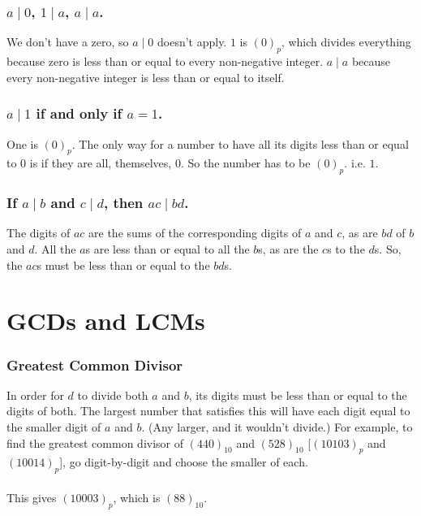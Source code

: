 \documentclass[12pt]{article}
\newcommand{\ppn}[1]{(#1)_p}
\begin{document}
\subsubsection*{$a \mid 0$, $1 \mid a$, $a \mid a$.}
We don't have a zero, so $a \mid 0$ doesn't apply. $1$ is $\ppn{0}$, which divides everything because zero is less than or equal to every non-negative integer. $a \mid a$ because every non-negative integer is less than or equal to itself.

\subsubsection*{$a \mid 1$ if and only if $a = 1$.}
One is $\ppn{0}$. The only way for a number to have all its digits less than or equal to $0$ is if they are all, themselves, $0$. So the number has to be $\ppn{0}$. i.e. $1$.

\subsubsection*{If $a \mid b$ and $c \mid d$, then $ac \mid bd$.}
The digits of $ac$ are the sums of the corresponding digits of $a$ and $c$, as are $bd$ of $b$ and $d$. All the $a$s are less than or equal to all the $b$s, as are the $c$s to the $d$s. So, the $ac$s must be less than or equal to the $bd$s.

\section*{GCDs and LCMs}
\subsubsection*{Greatest Common Divisor}
In order for $d$ to divide both $a$ and $b$, its digits must be less than or equal to the digits of both. The largest number that satisfies this will have each digit equal to the smaller digit of $a$ and $b$. (Any larger, and it wouldn't divide.) For example, to find the greatest common divisor of $(440)_{10}$ and $(528)_{10}$ [$\ppn{10103}$ and $\ppn{10014}$], go digit-by-digit and choose the smaller of each.\\
\ttfamily \small
{}
\normalfont \normalsize \\
This gives $\ppn{10003}$, which is $(88)_{10}$.
\end{document}
